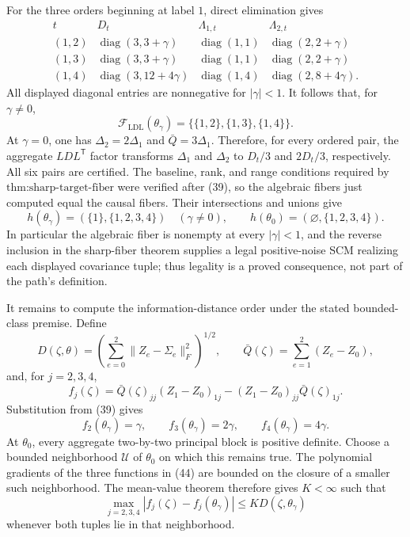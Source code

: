 For the three orders beginning at label \(1\), direct elimination gives
\[
\begin{array}{c|c|c|c}
t&D_t&\Lambda_{1,t}&\Lambda_{2,t}\\ \hline
(1,2)&\operatorname{diag}(3,3+\gamma)&\operatorname{diag}(1,1)&\operatorname{diag}(2,2+\gamma)\\
(1,3)&\operatorname{diag}(3,3+\gamma)&\operatorname{diag}(1,1)&\operatorname{diag}(2,2+\gamma)\\
(1,4)&\operatorname{diag}(3,12+4\gamma)&\operatorname{diag}(1,4)&\operatorname{diag}(2,8+4\gamma).
\end{array} \tag{41}
\]
All displayed diagonal entries are nonnegative for \(|\gamma|<1\).  It follows that, for \(\gamma\ne0\),
\[
 \mathcal F_{\mathrm{LDL}}(\theta_\gamma)
 =\{\{1,2\},\{1,3\},\{1,4\}\}. \tag{42}
\]
At \(\gamma=0\), one has \(\Delta_2=2\Delta_1\) and \(\bar Q=3\Delta_1\).  Therefore, for every ordered pair, the aggregate \(LDL^{\mathsf T}\) factor transforms \(\Delta_1\) and \(\Delta_2\) to \(D_t/3\) and \(2D_t/3\), respectively.  All six pairs are certified.  The baseline, rank, and range conditions required by \(\text{thm:sharp-target-fiber}\) were verified after (39), so the algebraic fibers just computed equal the causal fibers.  Their intersections and unions give
\[
 h(\theta_\gamma)=(\{1\},\{1,2,3,4\})\quad(\gamma\ne0),
 \qquad
 h(\theta_0)=(\varnothing,\{1,2,3,4\}). \tag{43}
\]
In particular the algebraic fiber is nonempty at every \(|\gamma|<1\), and the reverse inclusion in the sharp-fiber theorem supplies a legal positive-noise SCM realizing each displayed covariance tuple; thus legality is a proved consequence, not part of the path's definition.

It remains to compute the information-distance order under the stated bounded-class premise.  Define
\[
 D(\zeta,\theta)=\left(\sum_{e=0}^2\lVert Z_e-\Sigma_e\rVert_F^2\right)^{1/2},
 \qquad
 \bar Q(\zeta)=\sum_{e=1}^2(Z_e-Z_0),
\]
and, for \(j=2,3,4\),
\[
 f_j(\zeta)=\bar Q(\zeta)_{jj}(Z_1-Z_0)_{1j}
 -(Z_1-Z_0)_{jj}\bar Q(\zeta)_{1j}. \tag{44}
\]
Substitution from (39) gives
\[
 f_2(\theta_\gamma)=\gamma,\qquad
 f_3(\theta_\gamma)=2\gamma,\qquad
 f_4(\theta_\gamma)=4\gamma. \tag{45}
\]
At \(\theta_0\), every aggregate two-by-two principal block is positive definite.  Choose a bounded neighborhood \(\mathcal U\) of \(\theta_0\) on which this remains true.  The polynomial gradients of the three functions in (44) are bounded on the closure of a smaller such neighborhood.  The mean-value theorem therefore gives \(K<\infty\) such that
\[
 \max_{j=2,3,4}|f_j(\zeta)-f_j(\theta_\gamma)|
 \le K D(\zeta,\theta_\gamma) \tag{46}
\]
whenever both tuples lie in that neighborhood.

